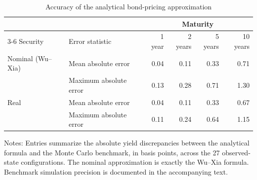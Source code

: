 \begin{table}[!htbp]
\centering
\begin{threeparttable}
\caption{Accuracy of the analytical bond-pricing approximation}\label{oa:tab_pricing_accuracy}
\begin{tabular*}{\textwidth}{@{\extracolsep{\fill}}llrrrr}
\toprule
& & \multicolumn{4}{c}{Maturity}\\
\cmidrule(lr){3-6}
Security & Error statistic & 1 year & 2 years & 5 years & 10 years\\
\midrule
Nominal (Wu--Xia) & Mean absolute error & 0.04 & 0.11 & 0.33 & 0.71\\
 & Maximum absolute error & 0.13 & 0.28 & 0.71 & 1.30\\
Real & Mean absolute error & 0.04 & 0.11 & 0.33 & 0.67\\
 & Maximum absolute error & 0.11 & 0.24 & 0.64 & 1.15\\
\bottomrule
\end{tabular*}
\begin{tablenotes}\footnotesize
\item Notes: Entries summarize the absolute yield discrepancies between the analytical formula and the Monte Carlo benchmark, in basis points, across the 27 observed-state configurations. The nominal approximation is exactly the Wu--Xia formula. Benchmark simulation precision is documented in the accompanying text.
\end{tablenotes}
\end{threeparttable}
\end{table}
